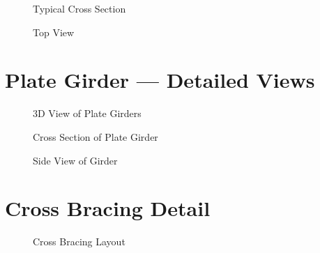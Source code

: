 \documentclass[12pt,a4paper]{report}
\numberwithin{table}{chapter}
\numberwithin{figure}{chapter}
\begin{document}
\begin{figure}[H]
\centering
{}
\caption{Typical Cross Section}
\label{fig:cross-section}
\end{figure}


\begin{figure}[H]
\centering
{}
\caption{Top View}
\label{fig:top-view}
\end{figure}


\section{Plate Girder --- Detailed Views}
\label{sec:girder-views}

\begin{figure}[H]
\centering
{}
\caption{3D View of Plate Girders}
\label{fig:girder-3d}
\end{figure}


\begin{figure}[H]
\centering
{}
\caption{Cross Section of Plate Girder}
\label{fig:girder-xsec}
\end{figure}


\begin{figure}[H]
\centering
{}
\caption{Side View of Girder}
\label{fig:girder-side}
\end{figure}


\section{Cross Bracing Detail}
\label{sec:bracing-detail}

\begin{figure}[H]
\centering
{}
\caption{Cross Bracing Layout}
\label{fig:cb-layout}
\end{figure}


\noindent
\begin{minipage}[t]{0.31\textwidth}
\centering
{}
\label{fig:cb-bracing-sec}
\end{minipage}
\hfill
\begin{minipage}[t]{0.31\textwidth}
\centering
{}
\label{fig:cb-top-chord}
\end{minipage}
\hfill
\begin{minipage}[t]{0.31\textwidth}
\centering
{}
\label{fig:cb-bottom-chord}
\end{minipage}
            
\end{document}
